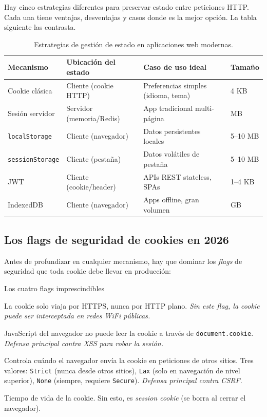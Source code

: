 Hay cinco estrategias diferentes para preservar estado entre
peticiones HTTP. Cada una tiene ventajas, desventajas y casos donde
es la mejor opción. La tabla siguiente las contrasta.


\begin{table}[htbp]
\centering
\caption{Estrategias de gestión de estado en aplicaciones web modernas.}
\footnotesize
\begin{tabularx}{\textwidth}{lXXl}
\toprule
\textbf{Mecanismo} & \textbf{Ubicación del estado} & \textbf{Caso de uso ideal} & \textbf{Tamaño}\\
\midrule
Cookie clásica & Cliente (cookie HTTP) & Preferencias simples (idioma, tema) & 4 KB\\
Sesión servidor & Servidor (memoria/Redis) & App tradicional multi-página & MB \\
\texttt{localStorage} & Cliente (navegador) & Datos persistentes locales & 5--10 MB\\
\texttt{sessionStorage} & Cliente (pestaña) & Datos volátiles de pestaña & 5--10 MB\\
JWT & Cliente (cookie/header) & APIs REST stateless, SPAs & 1--4 KB\\
IndexedDB & Cliente (navegador) & Apps offline, gran volumen & GB\\
\bottomrule
\end{tabularx}
\end{table}

\subsection{Los flags de seguridad de cookies en 2026}

Antes de profundizar en cualquier mecanismo, hay que dominar los
\emph{flags} de seguridad que toda cookie debe llevar en producción:

\begin{cajadefinicion}{Los cuatro flags imprescindibles}
\begin{description}[leftmargin=1.5cm]
\item[\texttt{Secure}.] La cookie solo viaja por HTTPS, nunca por HTTP
plano. \emph{Sin este flag, la cookie puede ser interceptada en redes
WiFi públicas.}
\item[\texttt{HttpOnly}.] JavaScript del navegador no puede leer la
cookie a través de \texttt{document.cookie}. \emph{Defensa principal
contra XSS para robar la sesión.}
\item[\texttt{SameSite}.] Controla cuándo el navegador envía la cookie
en peticiones de otros sitios. Tres valores: \texttt{Strict} (nunca
desde otros sitios), \texttt{Lax} (solo en navegación de nivel
superior), \texttt{None} (siempre, requiere \texttt{Secure}).
\emph{Defensa principal contra CSRF.}
\item[\texttt{Max-Age} o \texttt{Expires}.] Tiempo de vida de la
cookie. Sin esto, es \emph{session cookie} (se borra al cerrar el
navegador).
\end{description}
\end{cajadefinicion}

